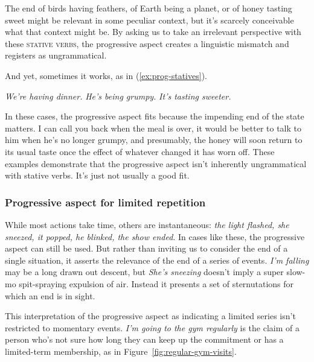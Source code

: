 The end of birds having feathers, of Earth being a planet, or of honey tasting sweet might be relevant in some peculiar context, but it's scarcely conceivable what that context might be. By asking us to take an irrelevant perspective with these \textsc{stative verbs}, the progressive aspect creates a linguistic mismatch and registers as ungrammatical.

And yet, sometimes it works, as in (\ref{ex:prog-statives}).

\ea\label{ex:prog-statives}
\ea \textit{We're having dinner.}
\ex \textit{He's being grumpy.}
\ex \textit{It's tasting sweeter.}
\z\z

In these cases, the progressive aspect fits because the impending end of the state matters. I can call you back when the meal is over, it would be better to talk to him when he's no longer grumpy, and presumably, the honey will soon return to its usual taste once the effect of whatever changed it has worn off. These examples demonstrate that the progressive aspect isn't inherently ungrammatical with stative verbs. It's just not usually a good fit.

\subsubsection{Progressive aspect for limited repetition}
While most actions take time, others are instantaneous: \textit{the light flashed, she sneezed, it popped, he blinked, the show ended}. In cases like these, the progressive aspect can still be used. But rather than inviting us to consider the end of a single situation, it asserts the relevance of the end of a series of events. \textit{I'm falling} may be a long drawn out descent, but \textit{She's sneezing} doesn't imply a super slow-mo spit-spraying expulsion of air. Instead it presents a set of sternutations for which an end is in sight.

This interpretation of the progressive aspect as indicating a limited series isn't restricted to momentary events. \textit{I'm going to the gym regularly} is the claim of a person who's not sure how long they can keep up the commitment or has a limited-term membership, as in Figure~\ref{fig:regular-gym-visits}.

